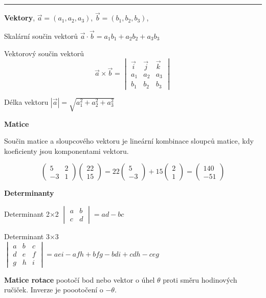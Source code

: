 \documentclass{article}
\begin{document}
\begin{multicols}{3}
\smallskip
\hrule


\textbf{Vektory}, $\vec a=(a_1,a_2,a_3)$, $\vec b=(b_1,b_2,b_3)$, 

Skalární součin vektorů
$\vec a\cdot\vec b=a_1 b_1 + a_2 b_2+a_3b_3$

Vektorový součin vektorů
\vspace*{-8pt}
$$\vec a\times \vec b=
\begin{vmatrix}
  \vec i & \vec j & \vec k\\
  a_1 & a_2 & a_3 \\
  b_1 & b_2 & b_3
\end{vmatrix}
$$

Délka vektoru  $|\vec a|=\sqrt{a_1^2+a_2^2+a_3^2}$

\textbf{Matice}

Součin matice a sloupcového vektoru je lineární kombinace sloupců matice, kdy koeficienty jsou komponentami vektoru.

$$
\begin{pmatrix}
  5& 2\\-3 & 1
\end{pmatrix}
\begin{pmatrix}
  22\\15
\end{pmatrix}
=
22
\begin{pmatrix}
  5\\-3
\end{pmatrix}
+
15
\begin{pmatrix}
  2\\1
\end{pmatrix}
=
\begin{pmatrix}
  140 \\-51
\end{pmatrix}
$$

\textbf{Determinanty}


Determinant 2$\times$2 \hfill$
\begin{vmatrix}
  a & b \\ c &d
\end{vmatrix}
=ad-bc
$

Determinant 3$\times$3 \\\null\hfill$
\begin{vmatrix}
  a & b & c \\ d & e &f \\ g & h & i
\end{vmatrix}
=aei-afh+bfg-bdi+cdh-ceg
$\hfill\null


\textbf{Matice rotace} pootočí bod nebo vektor o úhel $\theta$ proti směru hodinových ručiček. Inverze je poootočení o $-\theta$.


\end{multicols}
\end{document}
